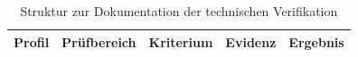\begin{table}[H]
  \centering
  \footnotesize
  \renewcommand{\arraystretch}{1.2}
  \caption{Struktur zur Dokumentation der technischen Verifikation}
  \label{tab:verification-matrix}
  \begin{tabularx}{\textwidth}{@{}p{}p{}p{}p{}>{\raggedright\arraybackslash}X@{}}
    \toprule
    \textbf{Profil} & \textbf{Prüfbereich} & \textbf{Kriterium} & \textbf{Evidenz} & \textbf{Ergebnis} \\
    \midrule
    \bottomrule
  \end{tabularx}
\end{table}
